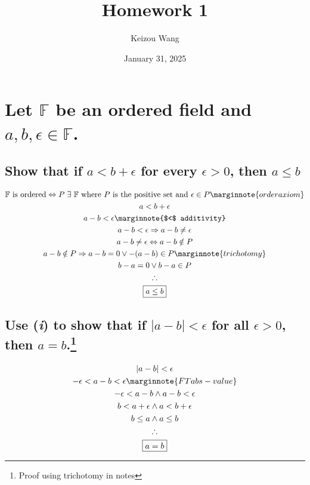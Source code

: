 \documentclass[letterpaper]{article}
\title{Homework 1}
\author{Keizou Wang}
\date{January 31, 2025}
\begin{document}
\maketitle

\section{Let $\mathbb{F}$ be an ordered field and $a, b, \epsilon \in \mathbb{F}$.}
\subsection{Show that if $a < b + \epsilon$ for every $\epsilon > 0$, then $a \leq b$}
\begin{gather*}
\mathbb{F}
\text{ is ordered} \Leftrightarrow
P \hspace{3pt} \exists \hspace{3pt} \mathbb{F}
\text{ where $P$ is the positive set and } \epsilon \in P \marginnote{order axiom} \\
a<b+\epsilon \\
a-b<\epsilon \marginnote{$<$ additivity} \\
a-b<\epsilon \Rightarrow a-b\neq\epsilon \\
a-b\neq\epsilon \Leftrightarrow a-b\notin P \\
a-b\notin P \Rightarrow a-b=0 \lor -(a-b) \in P \marginnote{trichotomy} \\
b-a=0 \lor b-a \in P \\
\therefore \\
\boxed{a \leq b}
\end{gather*}
\subsection{Use (\textit{i}) to show that if $|a-b|<\epsilon$ for all $\epsilon>0$, then $a=b$.\protect\footnote{Proof using trichotomy in notes}}
\begin{gather*}
|a-b|<\epsilon \\
-\epsilon < a-b < \epsilon \marginnote{FT abs-value} \\
-\epsilon < a-b \land a-b < \epsilon \\
b<a+\epsilon \land a<b+\epsilon \\
b\leq a \land a\leq b \\
\therefore \\
\boxed{a = b}
\end{gather*}
\end{document}
